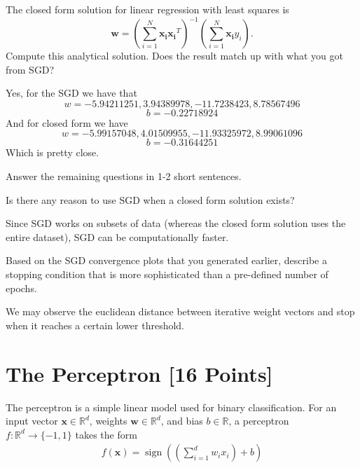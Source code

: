 \begin{problem}[2]
  The closed form solution for linear regression with least squares is \[\mathbf{w} = \left(\sum_{i=1}^N \mathbf{x_i}\mathbf{x_i}^T\right)^{-1}\left(\sum_{i=1}^N \mathbf{x_i}y_i\right).\]  Compute this analytical solution.  Does the result match up with what you got from SGD?
\end{problem}
\begin{solution}
 Yes, for the SGD we have that 
 $$w = -5.94211251, 3.94389978, -11.7238423, 8.78567496
 $$$$ 
 b = -0.22718924
 $$
 And for closed form we have
 $$w = -5.99157048, 4.01509955, -11.93325972, 8.99061096
 $$$$ 
 b = -0.31644251
 $$
 Which is pretty close.
\end{solution}

Answer the remaining questions in 1-2 short sentences.

\begin{problem}[2]
  Is there any reason to use SGD when a closed form solution exists?
\end{problem}
\begin{solution}
  Since SGD works on subsets of data (whereas the closed form solution uses the entire dataset), SGD can be computationally faster.
\end{solution}

\begin{problem}[2]
  Based on the SGD convergence plots that you generated earlier, describe a stopping condition that is more sophisticated than a pre-defined number of epochs.
\end{problem}
\begin{solution}
  We may observe the euclidean distance between iterative weight vectors and stop when it reaches a certain lower threshold.
\end{solution}



\newpage
\section{The Perceptron [16 Points]}

The perceptron is a simple linear model used for binary classification. For an input vector $\mathbf{x} \in \mathbb{R}^d$, weights $\mathbf{w} \in \mathbb{R}^d$, and bias $b \in \mathbb{R}$, a perceptron $f: \mathbb{R}^d \rightarrow \{-1,1\}$ takes the form
\begin{align*}
  f(\mathbf{x}) = \operatorname{sign}\left(\left(\sum_{i=1}^d w_i x_i\right) + b \right)
\end{align*}

